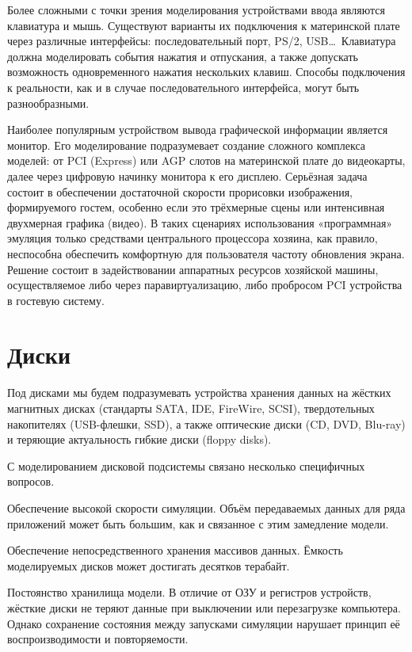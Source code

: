 Более сложными с точки зрения моделирования устройствами ввода являются клавиатура и мышь. Существуют варианты их подключения к материнской плате через различные интерфейсы: последовательный порт, PS/2, USB\dots\ Клавиатура должна моделировать события нажатия и отпускания, а также допускать возможность одновременного нажатия нескольких клавиш. Способы подключения к реальности, как и в случае последовательного интерфейса, могут быть разнообразными.

Наиболее популярным устройством вывода графической информации является монитор. Его моделирование подразумевает создание сложного комплекса моделей: от PCI (Express) или AGP слотов на материнской плате до видеокарты, далее через цифровую начинку монитора к его дисплею. Серьёзная задача состоит в обеспечении достаточной скорости прорисовки изображения, формируемого гостем, особенно если это трёхмерные сцены или интенсивная двухмерная графика (видео). В таких сценариях использования «программная» эмуляция только средствами центрального процессора хозяина, как правило, неспособна обеспечить комфортную для пользователя частоту обновления экрана. Решение состоит в задействовании аппаратных ресурсов хозяйской машины, осуществляемое либо через паравиртуализацию, либо пробросом PCI устройства в гостевую систему.

\section{Диски}

Под дисками мы будем подразумевать устройства хранения данных на жёстких магнитных дисках (стандарты SATA, IDE, FireWire, SCSI), твердотельных накопителях (USB-флешки, SSD), а также оптические диски (CD, DVD, Blu-ray) и теряющие актуальность гибкие диски (\abbr floppy disks).

С моделированием дисковой подсистемы связано несколько специфичных вопросов.

\begin{itemize*}
\item Обеспечение высокой скорости симуляции. Объём передаваемых данных для ряда приложений может быть большим, как и связанное с этим замедление модели.

\item Обеспечение непосредственного хранения массивов данных. Ёмкость моделируемых дисков может достигать десятков терабайт.
\item Постоянство хранилища модели. В отличие от ОЗУ и регистров устройств, жёсткие диски не теряют данные при выключении или перезагрузке компьютера. Однако сохранение состояния между запусками симуляции нарушает принцип её воспроизводимости и повторяемости.
\end{itemize*}

